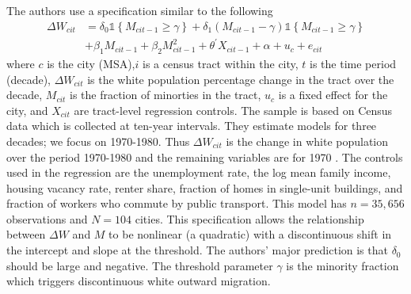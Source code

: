 \documentclass[10pt]{article}
\begin{document}
The authors use a specification similar to the following
$$
\begin{aligned}
\Delta W_{c i t} &=\delta_{0} \mathbb{1}\left\{M_{c i t-1} \geq \gamma\right\}+\delta_{1}\left(M_{c i t-1}-\gamma\right) \mathbb{1}\left\{M_{c i t-1} \geq \gamma\right\} \\
&+\beta_{1} M_{c i t-1}+\beta_{2} M_{c i t-1}^{2}+\theta^{\prime} X_{c i t-1}+\alpha+u_{c}+e_{c i t}
\end{aligned}
$$
where $c$ is the city (MSA),$i$ is a census tract within the city, $t$ is the time period (decade), $\Delta W_{c i t}$ is the white population percentage change in the tract over the decade, $M_{c i t}$ is the fraction of minorties in the tract, $u_{c}$ is a fixed effect for the city, and $X_{c i t}$ are tract-level regression controls. The sample is based on Census data which is collected at ten-year intervals. They estimate models for three decades; we focus on 1970-1980. Thus $\Delta W_{c i t}$ is the change in white population over the period 1970-1980 and the remaining variables are for 1970 . The controls used in the regression are the unemployment rate, the log mean family income, housing vacancy rate, renter share, fraction of homes in single-unit buildings, and fraction of workers who commute by public transport. This model has $n=35,656$ observations and $N=104$ cities. This specification allows the relationship between $\Delta W$ and $M$ to be nonlinear (a quadratic) with a discontinuous shift in the intercept and slope at the threshold. The authors' major prediction is that $\delta_{0}$ should be large and negative. The threshold parameter $\gamma$ is the minority fraction which triggers discontinuous white outward migration.
\end{document}
